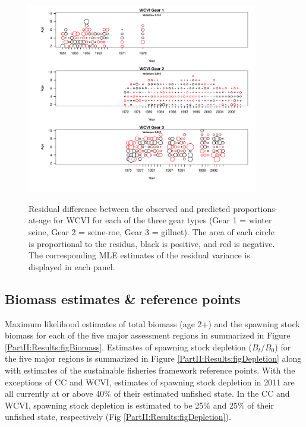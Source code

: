\begin{figure}
	\centering
	\includegraphics[width=0.9\textwidth]{../FIGS/qPriorFigs/iscam_fig_agecompsresid_WCVI.pdf}\\
	\caption{Residual difference between the observed and predicted proportions-at-age for WCVI for each of the three gear types (Gear 1 = winter seine, Gear 2 = seine-roe, Gear 3 = gillnet).  The area of each circle is proportional to the residua, black is positive, and red is negative.  The corresponding MLE estimates of the residual variance is displayed in each panel.}\label{PartII:Results:figAgeCompWCVI}
\end{figure}







\subsection{Biomass estimates \& reference points}

Maximum likelihood estimates of total biomass (age 2+) and the spawning stock biomass for each of the five major assessment regions in summarized in Figure \ref{PartII:Results:figBiomass}.  Estimates of spawning stock depletion ($B_t/B_0$) for the five major regions is summarized in Figure \ref{PartII:Results:figDepletion} along with estimates of the sustainable fisheries framework reference points.  With the exceptions of CC and WCVI, estimates of spawning stock depletion in 2011 are all currently at or above 40\% of their estimated unfished state. In the  CC and WCVI, spawning stock depletion is estimated to be  25\% and 25\% of their unfished state, respectively (Fig \ref{PartII:Results:figDepletion}).

